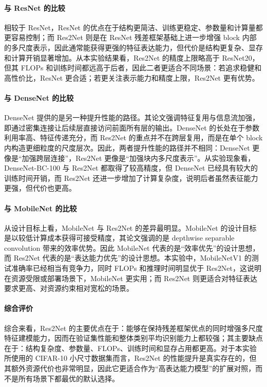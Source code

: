 \documentclass[a4paper]{article}
\begin{document}
\paragraph{与 ResNet 的比较}
相较于 ResNet，ResNet 的优点在于结构更简洁、训练更稳定、参数量和计算量都更容易控制\cite{resnet}；而 Res2Net 则是在 ResNet 残差框架基础上进一步增强 block 内部的多尺度表示，因此通常能获得更强的特征表达能力，但代价是结构更复杂、显存和计算开销显著增加。从本实验结果看，Res2Net 的精度上限略高于 ResNet20，但其 FLOPs 和训练时间都远高于后者，因此二者更适合不同场景：若追求稳健和高性价比，ResNet 更合适；若更关注表示能力和精度上限，Res2Net 更有优势。

\paragraph{与 DenseNet 的比较}
DenseNet 提供的是另一种提升性能的路径。其论文强调特征复用与信息流加强，即通过密集连接让后续层直接访问前面所有层的输出\cite{densenet}。DenseNet 的长处在于参数利用率高、特征传递充分，而 Res2Net 的重点并不在跨层复用，而是在单个 block 内构造更细粒度的尺度层次。因此，两者提升性能的路径并不相同：DenseNet 更像是“加强跨层连接”，Res2Net 更像是“加强块内多尺度表示”。从实验现象看，DenseNet-BC-100 与 Res2Net 都取得了较高精度，但 DenseNet 已经具有较大的训练时间开销，而 Res2Net 还进一步增加了计算复杂度，说明后者虽然表征能力更强，但代价也更高。

\paragraph{与 MobileNet 的比较}
从设计目标上看，MobileNet 与 Res2Net 的差异最明显。MobileNet 的设计目标是以较低计算成本获得可接受精度，其论文强调的是 depthwise separable convolution 带来的效率优势\cite{mobilenet}。因此 MobileNet 代表的是“效率优先”的设计思想，而 Res2Net 代表的是“表达能力优先”的设计思想。本实验中，MobileNetV1 的测试准确率已经相当有竞争力，同时 FLOPs 和推理时间明显优于 Res2Net，这说明在资源受限或部署场景下，MobileNet 更实用；而 Res2Net 则更适合对特征表达要求更高、对资源约束相对宽松的场景。

\paragraph{综合评价}
综合来看，Res2Net 的主要优点在于：能够在保持残差框架优点的同时增强多尺度特征建模能力，因而在验证集性能和整体类别平均识别能力上都较强；其主要缺点在于：结构复杂度、参数量、FLOPs、训练时间和显存占用都更高。对于本实验所使用的 CIFAR-10 小尺寸数据集而言，Res2Net 的性能提升是真实存在的，但其额外资源代价也非常明显，因此它更适合作为“高表达能力模型”的扩展对照，而不是所有场景下都最优的默认选择。
\end{document}
